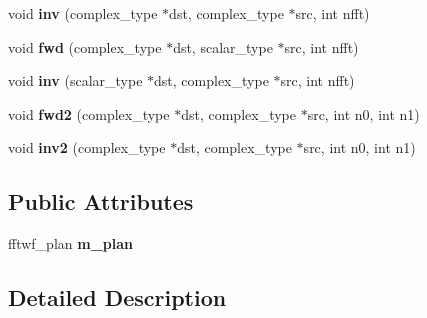 \begin{DoxyCompactItemize}
\item 
\mbox{\label{struct_eigen_1_1internal_1_1fftw__plan_3_01float_01_4_a78a8f341140274c6f774249a036cb0ec}} 
void {\bfseries inv} (complex\+\_\+type $\ast$dst, complex\+\_\+type $\ast$src, int nfft)
\item 
\mbox{\label{struct_eigen_1_1internal_1_1fftw__plan_3_01float_01_4_ac396c8a47534e2445f49dbedd6a9a215}} 
void {\bfseries fwd} (complex\+\_\+type $\ast$dst, scalar\+\_\+type $\ast$src, int nfft)
\item 
\mbox{\label{struct_eigen_1_1internal_1_1fftw__plan_3_01float_01_4_aed2d74d018c7b8855ce15610352876ff}} 
void {\bfseries inv} (scalar\+\_\+type $\ast$dst, complex\+\_\+type $\ast$src, int nfft)
\item 
\mbox{\label{struct_eigen_1_1internal_1_1fftw__plan_3_01float_01_4_a7e1dc8f284956388a99057679279d239}} 
void {\bfseries fwd2} (complex\+\_\+type $\ast$dst, complex\+\_\+type $\ast$src, int n0, int n1)
\item 
\mbox{\label{struct_eigen_1_1internal_1_1fftw__plan_3_01float_01_4_a73bdf2658c77f24e75b244d4b2c9c2a4}} 
void {\bfseries inv2} (complex\+\_\+type $\ast$dst, complex\+\_\+type $\ast$src, int n0, int n1)
\end{DoxyCompactItemize}
\subsection*{Public Attributes}
\begin{DoxyCompactItemize}
\item 
\mbox{\label{struct_eigen_1_1internal_1_1fftw__plan_3_01float_01_4_af38d8f20d7f6aa92b1a927332d6e0410}} 
fftwf\+\_\+plan {\bfseries m\+\_\+plan}
\end{DoxyCompactItemize}


\subsection{Detailed Description}
